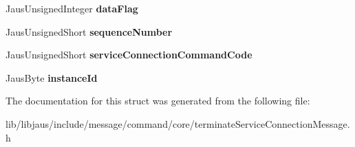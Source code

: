 \begin{DoxyCompactItemize}
\item 
\hypertarget{struct_terminate_service_connection_message_struct_a2e042affd46b0427430e34a4cfda02f7}{\-Jaus\-Unsigned\-Integer {\bfseries data\-Flag}}\label{struct_terminate_service_connection_message_struct_a2e042affd46b0427430e34a4cfda02f7}

\item 
\hypertarget{struct_terminate_service_connection_message_struct_a4ebb5312cc22e702ec5511e578708bd5}{\-Jaus\-Unsigned\-Short {\bfseries sequence\-Number}}\label{struct_terminate_service_connection_message_struct_a4ebb5312cc22e702ec5511e578708bd5}

\item 
\hypertarget{struct_terminate_service_connection_message_struct_a2ef1ee64c116a20685e9172c984fc7c5}{\-Jaus\-Unsigned\-Short {\bfseries service\-Connection\-Command\-Code}}\label{struct_terminate_service_connection_message_struct_a2ef1ee64c116a20685e9172c984fc7c5}

\item 
\hypertarget{struct_terminate_service_connection_message_struct_ae5e4e7d32c70de358f8c3e68fd4b3898}{\-Jaus\-Byte {\bfseries instance\-Id}}\label{struct_terminate_service_connection_message_struct_ae5e4e7d32c70de358f8c3e68fd4b3898}

\end{DoxyCompactItemize}


\-The documentation for this struct was generated from the following file\-:\begin{DoxyCompactItemize}
\item 
lib/libjaus/include/message/command/core/terminate\-Service\-Connection\-Message.\-h\end{DoxyCompactItemize}
